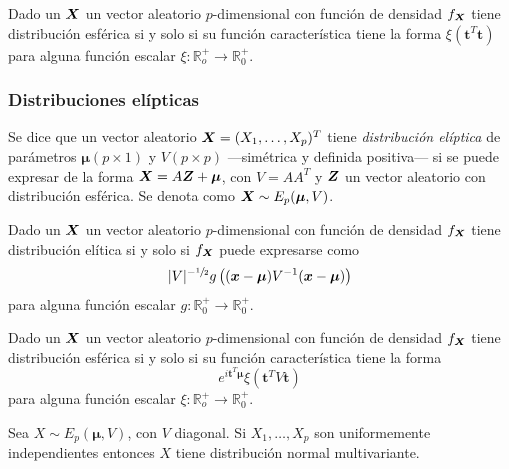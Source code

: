 \begin{nprop}
  Dado un $\boldsymbol{X}$ un vector aleatorio $p$-dimensional con función de densidad $f_{\boldsymbol{X}}$ tiene distribución esférica si y solo si su función característica tiene la forma $\xi(\boldsymbol t^T \boldsymbol t)$ para alguna función escalar $\xi: \mathbb R_o^+ \to \mathbb R_0^+$.
\end{nprop}

\subsubsection{Distribuciones elípticas}

\begin{ndef}
  Se dice que un vector aleatorio $\boldsymbol{X} = (X_1, \dots, X_p)^T$ tiene \textit{distribución elíptica} de parámetros $\boldsymbol \mu (p \times 1)$ y $V (p \times p)$ —simétrica y definida positiva— si se puede expresar de la forma $\boldsymbol{X} = A\boldsymbol{Z} + \boldsymbol \mu$, con $V = AA^T$ y $\boldsymbol{Z}$ un vector aleatorio con distribución esférica. Se denota como $\boldsymbol{X} \sim E_p(\boldsymbol \mu, V)$.
\end{ndef}

\begin{nprop}
  Dado un $\boldsymbol{X}$ un vector aleatorio $p$-dimensional con función de densidad $f_{\boldsymbol{X}}$ tiene distribución elítica si y solo si $f_{\boldsymbol{X}}$ puede expresarse como \[|V|^{-\sfrac{1}{2}}g\left((\boldsymbol x - \boldsymbol \mu)V^{-1}(\boldsymbol x - \boldsymbol \mu)\right)\] para alguna función escalar $g : \mathbb R_0^+ \to \mathbb R_0^+$.
\end{nprop}

\begin{nprop}
  Dado un $\boldsymbol{X}$ un vector aleatorio $p$-dimensional con función de densidad $f_{\boldsymbol{X}}$ tiene distribución esférica si y solo si su función característica tiene la forma \[e^{i \boldsymbol t^T \boldsymbol \mu}\xi(\boldsymbol t^T V \boldsymbol t)\] para alguna función escalar $\xi: \mathbb R_o^+ \to \mathbb R_0^+$.
\end{nprop}


\begin{nprop}
  Sea $X \sim E_p(\boldsymbol \mu, V)$, con $V$ diagonal. Si $X_1, \dots, X_p$ son uniformemente independientes entonces $X$ tiene distribución normal multivariante.
\end{nprop}

